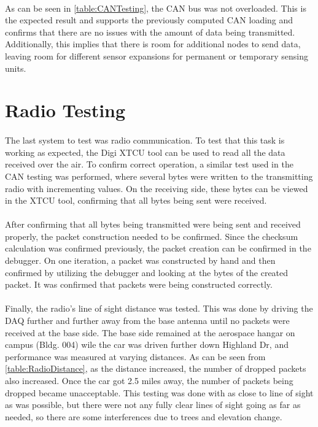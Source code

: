 \paragraph{}
As can be seen in \cref{table:CANTesting}, the CAN bus was not overloaded.
This is the expected result and supports the previously computed CAN loading and confirms that there are no issues with the amount of data being transmitted.
Additionally, this implies that there is room for additional nodes to send data, leaving room for different sensor expansions for permanent or temporary sensing units.

\section{Radio Testing}

\paragraph{}
The last system to test was radio communication.
To test that this task is working as expected, the Digi XTCU tool can be used to read all the data received over the air.
To confirm correct operation, a similar test used in the CAN testing was performed, where several bytes were written to the transmitting radio with incrementing values.
On the receiving side, these bytes can be viewed in the XTCU tool, confirming that all bytes being sent were received.

\paragraph{}
After confirming that all bytes being transmitted were being sent and received properly, the packet construction needed to be confirmed.
Since the checksum calculation was confirmed previously, the packet creation can be confirmed in the debugger.
On one iteration, a packet was constructed by hand and then confirmed by utilizing the debugger and looking at the bytes of the created packet.
It was confirmed that packets were being constructed correctly.

\paragraph{}
Finally, the radio's line of sight distance was tested.
This was done by driving the DAQ further and further away from the base antenna until no packets were received at the base side.
The base side remained at the aerospace hangar on campus (Bldg. 004) wile the car was driven further down Highland Dr, and performance was measured at varying distances.
As can be seen from \cref{table:RadioDistance}, as the distance increased, the number of dropped packets also increased.
Once the car got 2.5 miles away, the number of packets being dropped became unacceptable.
This testing was done with as close to line of sight as was possible, but there were not any fully clear lines of sight going as far as needed, so there are some interferences due to trees and elevation change.

